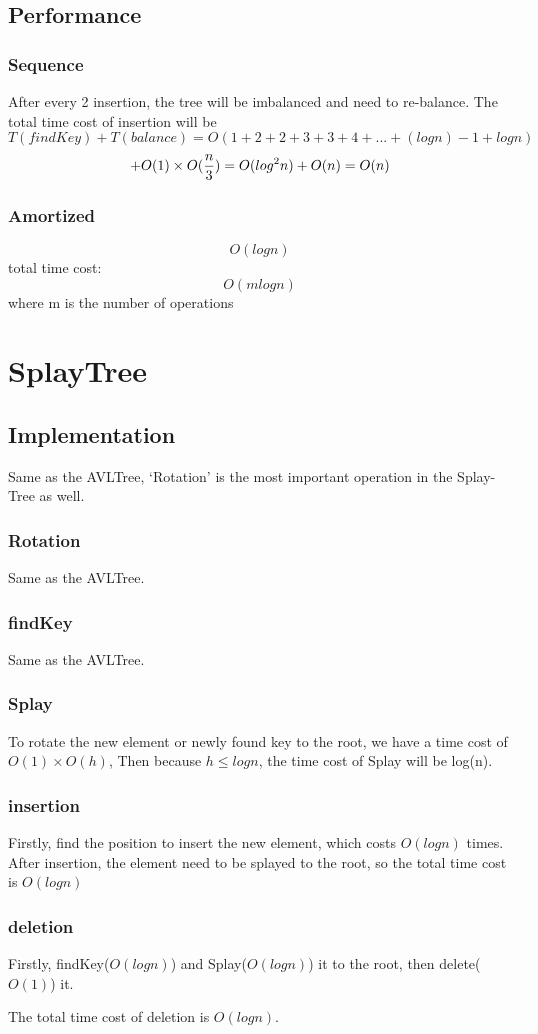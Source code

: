 \documentclass{article}
\begin{document}
\subsection{Performance}
\subsubsection{Sequence}
After every 2 insertion, the tree will be imbalanced and need to re-balance. The total time cost of insertion will be $$T(findKey) + T(balance)=O(1+2+2+3+3+4+...+(logn)-1+logn)$$$$+O(1)\times O({n\over 3})=O(log^2n)+O(n)=O(n)$$
\subsubsection{Amortized}
$$O(logn)$$
total time cost: $$O(mlogn)$$
where m is the number of operations
\section{SplayTree}


\subsection{Implementation}
Same as the AVLTree, `Rotation' is the most important operation in the Splay-Tree as well. 
\subsubsection{Rotation}
Same as the AVLTree.
\subsubsection{findKey}
Same as the AVLTree.
\subsubsection{Splay}
To rotate the new element or newly found key to the root, we have a time cost of $O(1)\times O(h)$, Then because $h\leq logn$, the time cost of Splay will be log(n).
\subsubsection{insertion}
Firstly, find the position to insert the new element, which costs $O(log n)$ times. After insertion, the element need to be splayed to the root, so the total time cost is $O(logn)$
\subsubsection{deletion}
Firstly, findKey($O(logn)$) and Splay($O(logn)$) it to the root, then delete($O(1)$) it.
\par
The total time cost of deletion is $O(logn)$.
\end{document}
